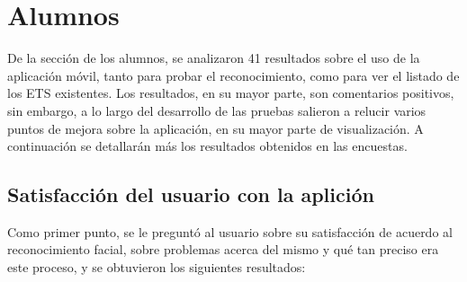 \section{Alumnos}
De la sección de los alumnos, se analizaron 41 resultados sobre el uso de la aplicación móvil, tanto para probar el reconocimiento, como para ver el listado de los ETS existentes. 
Los resultados, en su mayor parte, son comentarios positivos, sin embargo, a lo largo del desarrollo de las pruebas salieron a relucir varios puntos de mejora sobre la aplicación, en su mayor parte de visualización. A continuación se detallarán más los resultados obtenidos en las encuestas.

\subsection{Satisfacción del usuario con la aplición}
Como primer punto, se le preguntó al usuario sobre su satisfacción de acuerdo al reconocimiento facial, sobre problemas acerca del mismo y qué tan preciso era este proceso, y se obtuvieron los siguientes resultados:
\newpage

